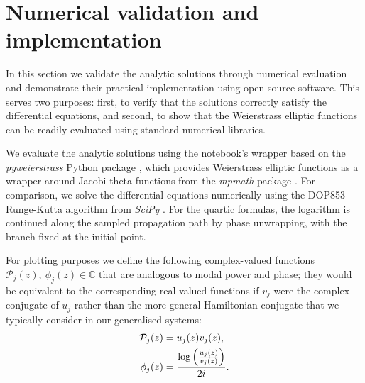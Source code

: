 \documentclass[11pt,a4paper]{article}
\numberwithin{equation}{section}
\begin{document}

\section{Numerical validation and implementation} \label{sec:num-val}

In this section we validate the analytic solutions through numerical evaluation and demonstrate their practical implementation using open-source software.
This serves two purposes: first, to verify that the solutions correctly satisfy the differential equations, and second, to show that the Weierstrass elliptic functions can be readily evaluated using standard numerical libraries.

We evaluate the analytic solutions using the notebook's wrapper based on the \emph{pyweierstrass} Python package \cite{laurentPyweierstrass2022}, which provides Weierstrass elliptic functions as a wrapper around Jacobi theta functions from the \emph{mpmath} package \cite{MpmathPythonLibrary2023}.
For comparison, we solve the differential equations numerically using the DOP853 Runge-Kutta algorithm from \emph{SciPy} \cite{virtanenSciPy10Fundamental2020}.
For the quartic formulas, the logarithm is continued along the sampled propagation path by phase unwrapping, with the branch fixed at the initial point.

For plotting purposes we define the following complex-valued functions $\mathcal{P}_j(z),\ \phi_j(z) \in \mathbb{C}$ that are analogous to modal power and phase; they would be equivalent to the corresponding real-valued functions if $v_j$ were the complex conjugate of $u_j$ rather than the more general Hamiltonian conjugate that we typically consider in our generalised systems:
\begin{align}
\mathcal{P}_j(z) &= u_j(z)v_j(z), \notag \\
\phi_j(z) &= \frac{\log\left(\frac{u_j(z)}{v_j(z)}\right)}{2 i}. \label{eq:A-phi-u-v}
\end{align}
\end{document}

